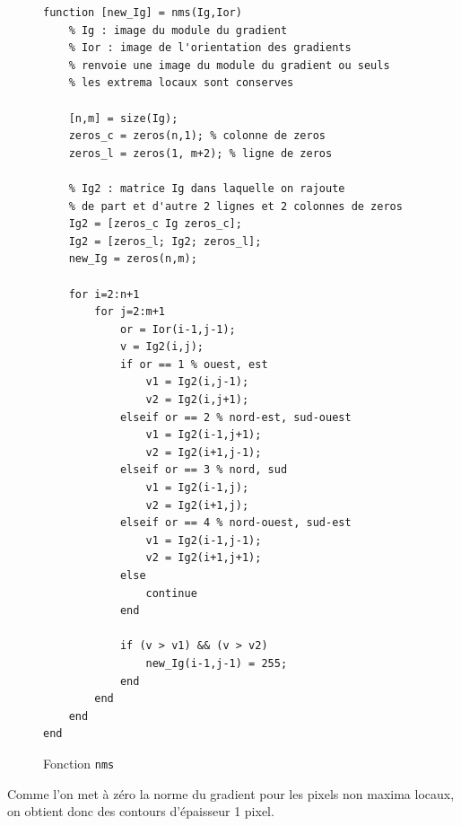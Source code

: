 \documentclass[a4paper]{article}
\begin{document}
\begin{figure}[H]
\centering
\begin{lstlisting}
function [new_Ig] = nms(Ig,Ior)
    % Ig : image du module du gradient
    % Ior : image de l'orientation des gradients 
    % renvoie une image du module du gradient ou seuls
    % les extrema locaux sont conserves
    
    [n,m] = size(Ig);
    zeros_c = zeros(n,1); % colonne de zeros 
    zeros_l = zeros(1, m+2); % ligne de zeros

    % Ig2 : matrice Ig dans laquelle on rajoute 
    % de part et d'autre 2 lignes et 2 colonnes de zeros
    Ig2 = [zeros_c Ig zeros_c];
    Ig2 = [zeros_l; Ig2; zeros_l];
    new_Ig = zeros(n,m);
    
    for i=2:n+1
        for j=2:m+1
            or = Ior(i-1,j-1);
            v = Ig2(i,j);
            if or == 1 % ouest, est
                v1 = Ig2(i,j-1);
                v2 = Ig2(i,j+1);
            elseif or == 2 % nord-est, sud-ouest
                v1 = Ig2(i-1,j+1);
                v2 = Ig2(i+1,j-1);
            elseif or == 3 % nord, sud
                v1 = Ig2(i-1,j);
                v2 = Ig2(i+1,j);
            elseif or == 4 % nord-ouest, sud-est
                v1 = Ig2(i-1,j-1);
                v2 = Ig2(i+1,j+1);
            else
                continue
            end
            
            if (v > v1) && (v > v2)
                new_Ig(i-1,j-1) = 255;
            end
        end
    end
end
\end{lstlisting}
\caption{Fonction \texttt{nms}}
\end{figure}

Comme l'on met à zéro la norme du gradient pour les pixels non maxima locaux, on
obtient donc des contours d'épaisseur 1 pixel.
\end{document}

